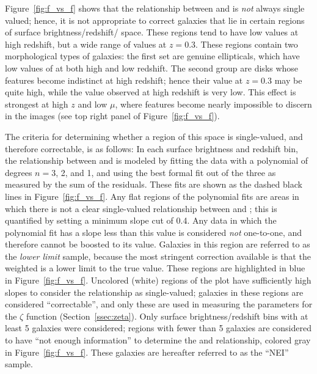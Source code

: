 \documentclass[twocolumn]{aastex6}
\begin{document}
Figure~\ref{fig:f_vs_f} shows that the relationship between \ffeaturesz{} and
\ffeaturesrest{} is \emph{not} always single valued; hence, it is not
appropriate to correct galaxies that lie in certain regions of surface
brightness/redshift/\ffeatures{} space. These regions tend to have low
\ffeatures{} values at high redshift, but a wide range of values at $z=0.3$.
These regions contain two morphological types of galaxies: the first set are
genuine ellipticals, which have low values of \ffeatures{} at both high and low
redshift. The second group are disks whose features become indistinct at high
redshift; hence their \ffeatures{} value at $z=0.3$ may be quite high, while
the value observed at high redshift is very low. This effect is strongest at
high $z$ and low $\mu$, where features become nearly impossible to discern in
the images (see top right panel of Figure~\ref{fig:f_vs_f}).

The criteria for determining whether a region of this space is single-valued,
and therefore correctable, is as follows: In each surface brightness and
redshift bin, the relationship between \ffeaturesz{} and \ffeaturesrest{} is
modeled by fitting the data with a polynomial of degrees $n=3$, 2, and 1, and
using the best formal fit out of the three as measured by the sum of the
residuals. These fits are shown as the dashed black lines in
Figure~\ref{fig:f_vs_f}. Any flat regions of the polynomial fits are areas in which
there is not a clear single-valued relationship between \ffeaturesz{} and
\ffeaturesrest; this is quantified by setting a minimum slope cut of 0.4. Any
data in which the polynomial fit has a slope less than this value is considered
\emph{not} one-to-one, and therefore \ffeaturesz{} cannot be boosted to its
\ffeaturesrest{} value.  Galaxies in this region are referred to as the
\emph{lower limit} sample, because the most stringent correction available is
that the weighted \ffeatures{} is a lower limit to the true value.  These
regions are highlighted in blue in Figure~\ref{fig:f_vs_f}. Uncolored (white)
regions of the plot have sufficiently high slopes to consider the relationship
as single-valued; galaxies in these regions are considered ``correctable'', and
only these are used in measuring the parameters for the $\zeta$ function
(Section~\ref{ssec:zeta}). Only surface brightness/redshift bins with at least
5 galaxies were considered; regions with fewer than 5 galaxies are considered
to have ``not enough information'' to determine the \ffeaturesz{} and
\ffeaturesrest{} relationship, colored gray in Figure~\ref{fig:f_vs_f}. These galaxies are hereafter referred to as the ``NEI'' sample.
\end{document}
